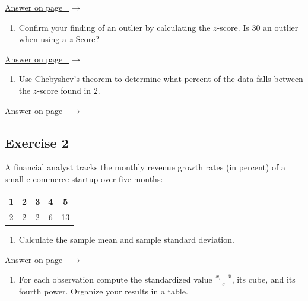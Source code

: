 \documentclass[
  11pt,
  letterpaper,
  DIV=11,
  numbers=noendperiod,
  oneside,
  open=any]{scrreprt}
\providecommand{\tightlist}{%
  \setlength{\itemsep}{0pt}\setlength{\parskip}{0pt}}\usepackage{longtable,booktabs,array}
\newcommand{\bsanswerref}[1]{%
  \par\nopagebreak\hypertarget{q-#1}{}\label{q-#1}%
  {\raggedleft\sffamily\footnotesize\hyperlink{a-#1}{\textcolor{bsaccent}{Answer on page \pageref{a-#1}\ $\rightarrow$}}\par}%
  \medskip}
\begin{document}
\bsanswerref{bsans43}

\begin{enumerate}
\def\labelenumi{\arabic{enumi}.}
\setcounter{enumi}{1}
\tightlist
\item
  Confirm your finding of an outlier by calculating the \(z\)-score. Is
  \(30\) an outlier when using a \(z\)-Score?
\end{enumerate}

\bsanswerref{bsans44}

\begin{enumerate}
\def\labelenumi{\arabic{enumi}.}
\setcounter{enumi}{2}
\tightlist
\item
  Use Chebyshev's theorem to determine what percent of the data falls
  between the \(z\)-score found in \(2\).
\end{enumerate}

\bsanswerref{bsans45}

\subsection*{Exercise 2}\label{exercise-2-4}

A financial analyst tracks the monthly revenue growth rates (in percent)
of a small e-commerce startup over five months:

\begin{center}
\begin{tabular}{ccccc}
\toprule
1 & 2 & 3 & 4 & 5 \\
\midrule
2 & 2 & 2 & 6 & 13 \\
\bottomrule
\end{tabular}
\end{center}

\begin{enumerate}
\def\labelenumi{\arabic{enumi}.}
\tightlist
\item
  Calculate the sample mean and sample standard deviation.
\end{enumerate}

\bsanswerref{bsans46}

\begin{enumerate}
\def\labelenumi{\arabic{enumi}.}
\setcounter{enumi}{1}
\tightlist
\item
  For each observation compute the standardized value
  \(\frac{x_i - \bar{x}}{s}\), its cube, and its fourth power. Organize
  your results in a table.
\end{enumerate}
\end{document}
